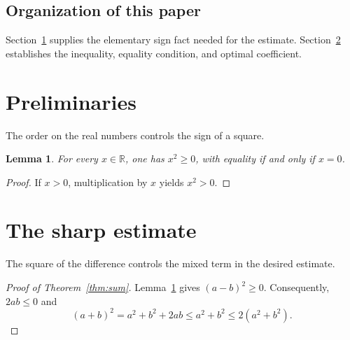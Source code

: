 \documentclass[a4paper,11pt,reqno]{amsart}
\newcommand{\R}{\mathbb{R}}
\numberwithin{equation}{section}
\theoremstyle{plain}
\newtheorem{lem}[thm]{Lemma}
\theoremstyle{definition}
\theoremstyle{remark}
\begin{document}
\subsection{Organization of this paper}
Section~\ref{sec:preliminaries} supplies the elementary sign fact needed for the estimate. Section~\ref{sec:proof} establishes the inequality, equality condition, and optimal coefficient.

\section{Preliminaries}\label{sec:preliminaries}
The order on the real numbers controls the sign of a square.
\begin{lem}\label{lem:square}
For every $x\in\R$, one has $x^2\geq0$, with equality if and only if $x=0$.
\end{lem}
\begin{proof}
If $x>0$, multiplication by $x$ yields $x^2>0$.
\end{proof}

\section{The sharp estimate}\label{sec:proof}
The square of the difference controls the mixed term in the desired estimate.
\begin{proof}[Proof of Theorem~\ref{thm:sum}]
Lemma~\ref{lem:square} gives $(a-b)^2\geq0$. Consequently, $2ab\leq0$ and
\[
 (a+b)^2=a^2+b^2+2ab\leq a^2+b^2\leq 2(a^2+b^2).
\]
\end{proof}
\end{document}
